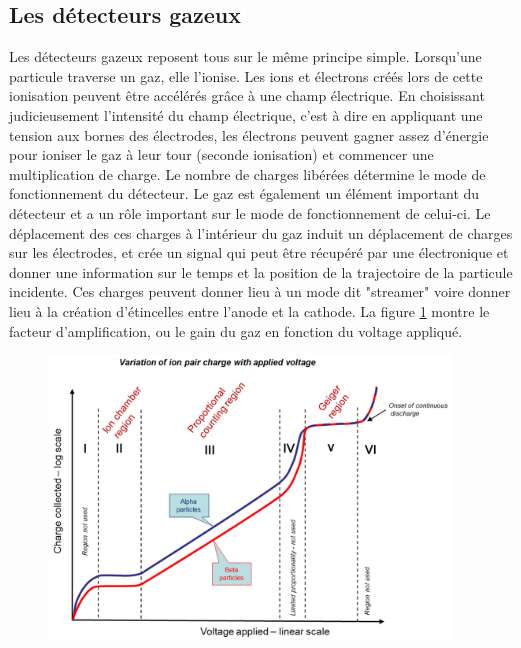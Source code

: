 \subsection{Les détecteurs gazeux}
Les détecteurs gazeux reposent tous sur le même principe simple. Lorsqu'une particule traverse un gaz, elle l'ionise. Les ions et électrons créés lors de cette ionisation peuvent être accélérés grâce à une champ électrique. En choisissant judicieusement l'intensité du champ électrique, c'est à dire en appliquant une tension aux bornes des électrodes, les électrons peuvent gagner assez d'énergie pour ioniser le gaz à leur tour (seconde ionisation) et commencer une multiplication de charge. Le nombre de charges libérées détermine le mode de fonctionnement du détecteur. Le gaz est également un élément important du détecteur et a un rôle important sur le mode de fonctionnement de celui-ci. Le déplacement des ces charges à l'intérieur du gaz induit un déplacement de charges sur les électrodes, et crée un signal qui peut être récupéré par une électronique et donner une information sur le temps et la position de la trajectoire de la particule incidente. Ces charges peuvent donner lieu à un mode dit "streamer" voire donner lieu à la création d'étincelles entre l'anode et la cathode. La figure \ref{mult} montre le facteur d'amplification, ou le gain du gaz en fonction du voltage appliqué. 

\begin{figure}[h!]
	\centering
	\includegraphics[width=0.95\textwidth]{RPC/gasgain.png}
	\label{mult}
\end{figure}

